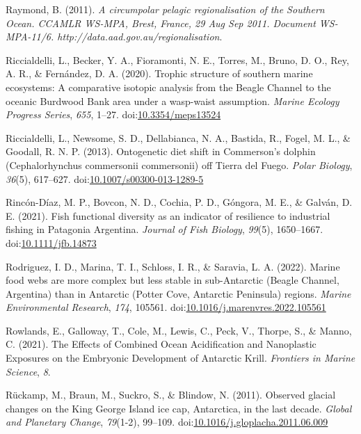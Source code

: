 \documentclass[
]{article}
\newlength{\cslhangindent}
\newenvironment{CSLReferences}[2] %
 {\begin{list}{}{%
  \setlength{\itemindent}{0pt}
  \setlength{\leftmargin}{0pt}
  \setlength{\parsep}{0pt}
  \ifodd #1
   \setlength{\leftmargin}{\cslhangindent}
   \setlength{\itemindent}{-1\cslhangindent}
  \fi
  \setlength{\itemsep}{#2\baselineskip}}}
 {\end{list}}
\begin{document}
\begin{CSLReferences}{1}{0}
Raymond, B. (2011). \emph{A circumpolar pelagic regionalisation of the
{Southern Ocean}. {CCAMLR WS-MPA}, {Brest}, {France}, 29
{Aug} {Sep} 2011. {Document WS-MPA-11}/6.
{http://data.aad.gov.au/regionalisation}}.

Riccialdelli, L., Becker, Y. A., Fioramonti, N. E., Torres, M., Bruno,
D. O., Rey, A. R., \& Fernández, D. A. (2020). Trophic structure of
southern marine ecosystems: A comparative isotopic analysis from the
{Beagle Channel} to the oceanic {Burdwood Bank} area under a wasp-waist
assumption. \emph{Marine Ecology Progress Series}, \emph{655}, 1--27.
doi:\href{https://doi.org/10.3354/meps13524}{10.3354/meps13524}

Riccialdelli, L., Newsome, S. D., Dellabianca, N. A., Bastida, R.,
Fogel, M. L., \& Goodall, R. N. P. (2013). Ontogenetic diet shift in
{Commerson}'s dolphin ({Cephalorhynchus} commersonii commersonii) off
{Tierra} del {Fuego}. \emph{Polar Biology}, \emph{36}(5), 617--627.
doi:\href{https://doi.org/10.1007/s00300-013-1289-5}{10.1007/s00300-013-1289-5}

Rincón-Díaz, M. P., Bovcon, N. D., Cochia, P. D., Góngora, M. E., \&
Galván, D. E. (2021). Fish functional diversity as an indicator of
resilience to industrial fishing in {Patagonia Argentina}. \emph{Journal
of Fish Biology}, \emph{99}(5), 1650--1667.
doi:\href{https://doi.org/10.1111/jfb.14873}{10.1111/jfb.14873}

Rodriguez, I. D., Marina, T. I., Schloss, I. R., \& Saravia, L. A.
(2022). Marine food webs are more complex but less stable in
sub-{Antarctic} ({Beagle Channel}, {Argentina}) than in {Antarctic}
({Potter Cove}, {Antarctic Peninsula}) regions. \emph{Marine
Environmental Research}, \emph{174}, 105561.
doi:\href{https://doi.org/10.1016/j.marenvres.2022.105561}{10.1016/j.marenvres.2022.105561}

Rowlands, E., Galloway, T., Cole, M., Lewis, C., Peck, V., Thorpe, S.,
\& Manno, C. (2021). The {Effects} of {Combined Ocean Acidification} and
{Nanoplastic Exposures} on the {Embryonic Development} of {Antarctic
Krill}. \emph{Frontiers in Marine Science}, \emph{8}.

Rückamp, M., Braun, M., Suckro, S., \& Blindow, N. (2011). Observed
glacial changes on the {King George Island} ice cap, {Antarctica}, in
the last decade. \emph{Global and Planetary Change}, \emph{79}(1-2),
99--109.
doi:\href{https://doi.org/10.1016/j.gloplacha.2011.06.009}{10.1016/j.gloplacha.2011.06.009}


\end{CSLReferences}
\end{document}
